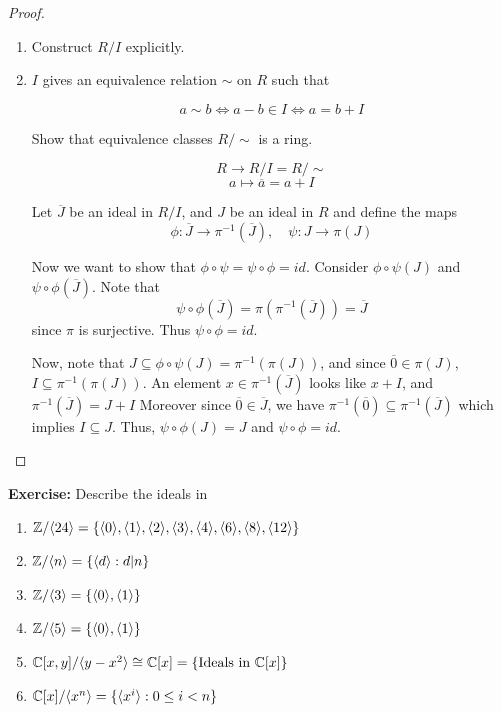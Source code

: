 \documentclass[12pt]{amsart}
\begin{document}
\begin{proof}
    \bbni
    \begin{enumerate}
        \item Construct $R/I$ explicitly. 
        
        \item $I$ gives an equivalence relation $\sim$ on $R$ such that
        
        \[a \sim b \iff a - b \in I \iff a = b + I\]
        
        Show that equivalence classes $R/\sim$ is a ring. 
        
        \[R \to R /I = R/\sim\]
        \[a \mapsto \overline{a} = a + I\]


     Let $\overline J$ be an ideal in $R/I$, and $J$ be an ideal in $R$ and define the maps 
        \[\phi: \overline{J} \to \pi^{-1}(\overline{J}), \quad \psi: J \to \pi(J)\]

        Now we want to show that $\phi \circ \psi = \psi \circ \phi =id$. Consider $\phi \circ \psi(J)$ and $\psi \circ \phi(\overline J)$. Note that
        \[\psi \circ \phi(\overline J) = \pi (\pi^{-1} (\overline J)) = \overline J\]
        since $\pi$ is surjective. Thus $\psi \circ \phi = id$. 

        Now, note that $J \subseteq \phi \circ \psi (J) = \pi^{-1}(\pi(J))$, and since $\overline 0 \in \pi(J)$, $I \subseteq \pi^{-1}(\pi(J))$. An element $x \in \pi^{-1}(\overline J)$ looks like $x + I$, and $\pi^{-1}(\overline J) = J + I$ 
        Moreover since $\overline{0} \in \overline{J}$, we have $\pi^{-1}(\overline{0}) \subseteq \pi^{-1}(\overline{J})$ which implies $I \subseteq J$.  Thus, $\psi \circ \phi(J) = J$ and $\psi \circ \phi = id$.    
    \end{enumerate}
\end{proof}

\textbf{Exercise:} Describe the ideals in 
    \begin{enumerate}
        \item $\mathbb Z/\langle 24 \rangle= \{\langle 0 \rangle, \langle 1 \rangle,\langle 2 \rangle,\langle 3 \rangle, \langle 4 \rangle,\langle 6 \rangle, \langle 8 \rangle, \langle 12 \rangle\}$
        \item $\mathbb Z/\langle n \rangle = \{\langle d \rangle: d | n\}$
        \item $\mathbb Z/\langle 3 \rangle = \{\langle 0 \rangle, \langle 1 \rangle\}$
        \item $\mathbb Z/\langle 5 \rangle = \{\langle 0 \rangle, \langle 1 \rangle\}$
        \item $\mathbb C[x,y]/\langle y - x^2\rangle \cong \mathbb C[x] = \{\text{Ideals in } \mathbb C[x]\}$
        \item $\mathbb C[x]/\langle x^n\rangle = \{\langle x^i \rangle : 0 \leq i < n\}$
    \end{enumerate}
\end{document}

